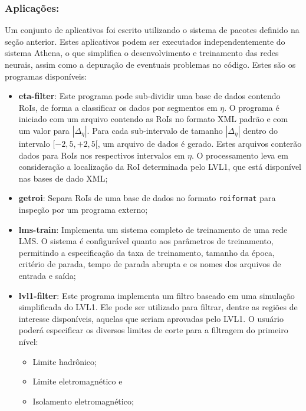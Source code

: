 \subsubsection{Aplicações:}

Um conjunto de aplicativos foi escrito utilizando o sistema de pacotes
definido na seção anterior. Estes aplicativos podem ser executados
independentemente do sistema Athena, o que simplifica o desenvolvimento e
treinamento das redes neurais, assim como a depuração de eventuais problemas
no código. Estes são os programas disponíveis:

\begin{itemize}

\item \textbf{eta-filter}: Este programa pode sub-dividir uma base de dados
contendo RoIs, de forma a classificar os dados por segmentos em $\eta$. O
programa é iniciado com um arquivo contendo as RoIs no formato XML padrão e
com um valor para $|\Delta_\eta|$. Para cada sub-intervalo de tamanho
$|\Delta_\eta|$ dentro do intervalo $[-2,5, +2,5[$, um arquivo de dados é
gerado. Estes arquivos conterão dados para RoIs nos respectivos intervalos em
$\eta$. O processamento leva em consideração a localização da RoI determinada
pelo LVL1, que está disponível nas bases de dado XML;

\item \textbf{getroi}: Separa RoIs de uma base de dados no formato
\texttt{roiformat} para inspeção por um programa externo;

\item \textbf{lms-train}: Implementa um sistema completo de treinamento 
de uma rede LMS. O sistema é configurável quanto aos parâmetros de
treinamento, permitindo a especificação da taxa de treinamento, tamanho da
época, critério de parada, tempo de parada abrupta e os nomes dos arquivos de
entrada e saída;

\item \textbf{lvl1-filter}: Este programa implementa um filtro baseado em uma
simulação simplificada do LVL1. Ele pode ser utilizado para filtrar, dentre as
regiões de interesse disponíveis, aquelas que seriam aprovadas pelo LVL1. O
usuário poderá especificar os diversos limites de corte para a filtragem do
primeiro nível:

\begin{itemize}
\item Limite hadrônico;
\item Limite eletromagnético e
\item Isolamento eletromagnético;
\end{itemize}


\end{itemize}
